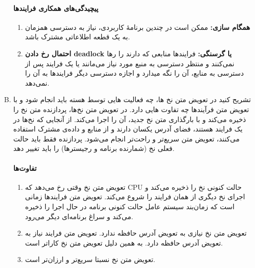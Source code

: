 \documentclass[]{article}
\begin{document}
\begin{enumerate}[(A)]
          \paragraph*{پیچیدگی‌های همکاری فرایندها}
          \begin{enumerate}[-]
              \item \textbf{همگام سازی:}
                    ممکن است در چندین برنامۀ کاربردی، نیاز به دسترسی همزمان به یک قطعه اطلاعاتی مشترک باشد.
              \item \textbf{احتمال رخ دادن deadlock یا گرسنگی:}
                    فرایندها منابعی که دارند را رها نمی‌کنند و منتظر دسترسی به منبع مورد نیاز می‌مانند یا یک فرایند پس از دسترسی به منابع، آن را نگه میدارد و اجازه دسترسی دیگر فرایندها به آن را نمی‌دهد.
          \end{enumerate}
    \item {ﺗﺸﺮﯾﺢ ﮐﻨﯿﺪ ﺩﺭ ﺗﻌﻮﯾﺾ ﻣﺘﻦ ﻧﺦ ﻫﺎ، ﭼﻪ ﻓﻌﺎﻟﯿﺖ ﻫﺎﯾﯽ ﺗﻮﺳﻂ ﻫﺴﺘﻪ ﺑﺎﯾﺪ ﺍﻧﺠﺎﻡ ﺷﻮﺩ ﻭ ﺑﺎ ﺗﻌﻮﯾﺾ ﻣﺘﻦ ﻓﺮﺁﯾﻨﺪﻫﺎ ﭼﻪ ﺗﻔﺎﻭﺕ ﻫﺎﯾﯽ ﺩﺍﺭﺩ.}
          در تعویض متن نخ‌ها، پردازنده متن نخ را ذخیره می‌کند و با بارگذاری متن نخ جدید، آن را اجرا می‌کند.
          از آنجایی که نخ‌ها در یک فرایند هستند، فضای آدرس یکسان دارند و از منابع و داده‌ی مشترک استفاده می‌کنند، تعویض متن سریع‌تر و راحت‌تر انجام می‌شود.
          پردازنده فقط باید حالت فعلی نخ (شمارنده برنامه و رجیسترها) را باید تغییر دهد.
          \vspace{-0.25cm}
          \paragraph*{تفاوت‌ها}
          \begin{enumerate}[1.]
              \item تعویض متن نخ وقتی رخ می‌دهد که CPU حالت کنونی نخ را ذخیره می‌کند و اجرای نخ دیگری از همان فرایند را شروع می‌کند.
                    تعویض متن فرایندها زمانی‌ است که زمان‌بند سیستم عامل حالت کنونی برنامه در حال اجرا را ذخیره می‌کند و سراغ برنامه‌ای دیگر می‌رود.
              \item تعویض متن نخ نیازی به تعویض آدرس حافظه ندارد.
                    تعویض متن فرایند نیاز به تعویض آدرس حافظه دارد. به همین دلیل تعویض متن نخ کاراتر است.
              \item تعویض متن نخ نسبتا سریع‌تر و ارزان‌تر است.
          \end{enumerate}
\end{enumerate}
\end{document}
